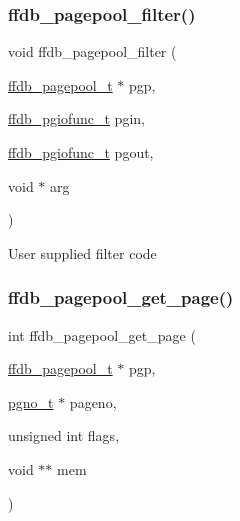 \subsubsection{\texorpdfstring{ffdb\_pagepool\_filter()}{ffdb\_pagepool\_filter()}}
{\footnotesize\ttfamily void ffdb\+\_\+pagepool\+\_\+filter (\begin{DoxyParamCaption}\item[{\mbox{\hyperlink{adat-devel_2other__libs_2filedb_2filehash_2ffdb__pagepool_8h_a73290f737b0e5f8be90a0fa96ddf6ab6}{ffdb\+\_\+pagepool\+\_\+t}} $\ast$}]{pgp,  }\item[{\mbox{\hyperlink{adat__devel_2other__libs_2filedb_2filehash_2ffdb__pagepool_8h_abe9c83a47a1f5babe21df1582aeb8022}{ffdb\+\_\+pgiofunc\+\_\+t}}}]{pgin,  }\item[{\mbox{\hyperlink{adat__devel_2other__libs_2filedb_2filehash_2ffdb__pagepool_8h_abe9c83a47a1f5babe21df1582aeb8022}{ffdb\+\_\+pgiofunc\+\_\+t}}}]{pgout,  }\item[{void $\ast$}]{arg }\end{DoxyParamCaption})}

User supplied filter code \mbox{\label{adat-devel_2other__libs_2filedb_2filehash_2ffdb__pagepool_8c_a5b3c5e95803e8cb5f6eee48855f12f27}} 
\subsubsection{\texorpdfstring{ffdb\_pagepool\_get\_page()}{ffdb\_pagepool\_get\_page()}}
{\footnotesize\ttfamily int ffdb\+\_\+pagepool\+\_\+get\+\_\+page (\begin{DoxyParamCaption}\item[{\mbox{\hyperlink{adat-devel_2other__libs_2filedb_2filehash_2ffdb__pagepool_8h_a73290f737b0e5f8be90a0fa96ddf6ab6}{ffdb\+\_\+pagepool\+\_\+t}} $\ast$}]{pgp,  }\item[{\mbox{\hyperlink{adat-devel_2other__libs_2filedb_2filehash_2ffdb__db_8h_a000813331643d38481142bcce7de1501}{pgno\+\_\+t}} $\ast$}]{pageno,  }\item[{unsigned int}]{flags,  }\item[{void $\ast$$\ast$}]{mem }\end{DoxyParamCaption})}

